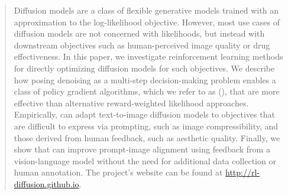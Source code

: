 \vspace{-1em}
\begin{abstract}
Diffusion models are a class of flexible generative models trained with an approximation to the log-likelihood objective.
However, most use cases of diffusion models are not concerned with likelihoods, but instead with downstream objectives such as human-perceived image quality or drug effectiveness.
In this paper, we investigate reinforcement learning methods for directly optimizing diffusion models for such objectives.
We describe how posing denoising as a multi-step decision-making problem enables a class of policy gradient algorithms, which we refer to as \methodfull{} (\methodours), that are more effective than alternative reward-weighted likelihood approaches.
Empirically, \methodours{} can adapt text-to-image diffusion models to objectives that are difficult to express via prompting, such as image compressibility, and those derived from human feedback, such as aesthetic quality.
Finally, we show that \methodours{} can improve prompt-image alignment using feedback from a vision-language model without the need for additional data collection or human annotation. The project's website can be found at \url{http://rl-diffusion.github.io}.

\vspace{-1em}

\end{abstract}
